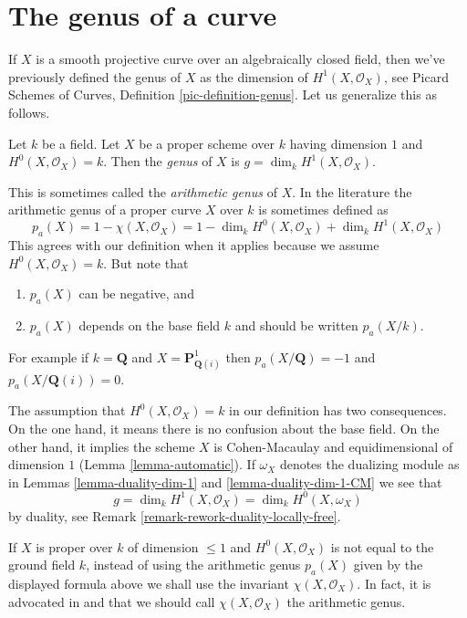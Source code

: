 \section{The genus of a curve}
\label{section-genus}

\noindent
If $X$ is a smooth projective curve over an algebraically closed field,
then we've previously defined the genus of $X$ as the dimension of
$H^1(X, \mathcal{O}_X)$, see
Picard Schemes of Curves, Definition \ref{pic-definition-genus}.
Let us generalize this as follows.

\begin{definition}
\label{definition-genus}
Let $k$ be a field. Let $X$ be a proper scheme over $k$ having
dimension $1$ and $H^0(X, \mathcal{O}_X) = k$.
Then the {\it genus} of $X$ is $g = \dim_k H^1(X, \mathcal{O}_X)$.
\end{definition}

\noindent
This is sometimes called the {\it arithmetic genus} of $X$.
In the literature the arithmetic genus of a proper curve $X$
over $k$ is sometimes defined as
$$
p_a(X) = 1 - \chi(X, \mathcal{O}_X) =
1 - \dim_k H^0(X, \mathcal{O}_X) + \dim_k H^1(X, \mathcal{O}_X)
$$
This agrees with our definition when it applies because we assume
$H^0(X, \mathcal{O}_X) = k$. But note that
\begin{enumerate}
\item $p_a(X)$ can be negative, and
\item $p_a(X)$ depends on the base field $k$ and should be written $p_a(X/k)$.
\end{enumerate}
For example if $k = \mathbf{Q}$
and $X = \mathbf{P}^1_{\mathbf{Q}(i)}$ then
$p_a(X/\mathbf{Q}) = -1$ and $p_a(X/\mathbf{Q}(i)) = 0$.

\medskip\noindent
The assumption that $H^0(X, \mathcal{O}_X) = k$ in our definition has
two consequences. On the one hand, it means there is no confusion about
the base field. On the other hand, it implies the scheme $X$ is
Cohen-Macaulay and equidimensional of dimension $1$
(Lemma \ref{lemma-automatic}). If $\omega_X$ denotes the dualizing
module as in Lemmas \ref{lemma-duality-dim-1} and
\ref{lemma-duality-dim-1-CM} we see that
\begin{equation}
\label{equation-genus}
g = \dim_k H^1(X, \mathcal{O}_X) = \dim_k H^0(X, \omega_X)
\end{equation}
by duality, see Remark \ref{remark-rework-duality-locally-free}.

\medskip\noindent
If $X$ is proper over $k$ of dimension $\leq 1$ and $H^0(X, \mathcal{O}_X)$
is not equal to the ground field $k$, instead of using the arithmetic genus
$p_a(X)$ given by the displayed formula above we shall use the invariant
$\chi(X, \mathcal{O}_X)$. In fact, it is advocated in
\cite[page 276]{FAC} and \cite[Introduction]{Hirzebruch}
that we should call $\chi(X, \mathcal{O}_X)$ the arithmetic genus.


